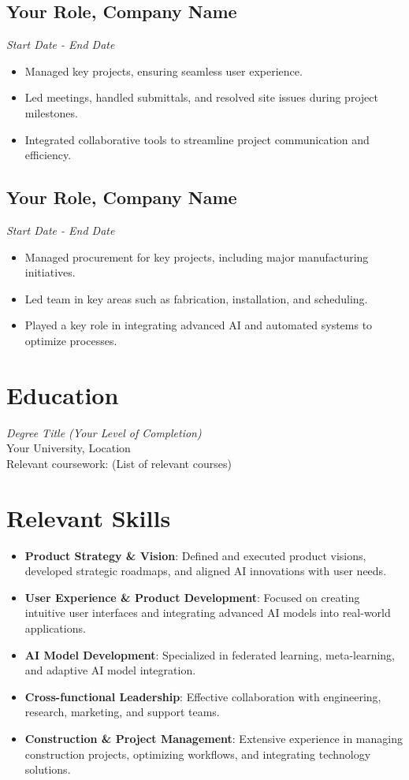 \documentclass[a4paper,10pt]{article}
\newcommand{\daterange}[1]{\textit{\textcolor{mybronze}{#1}}}
\newcommand{\skill}[1]{\textbf{\textcolor{mysecondary}{#1}}}
\begin{document}
\subsection*{Your Role, Company Name}
\daterange{Start Date - End Date}
\begin{itemize}
    \item Managed key projects, ensuring seamless user experience.
    \item Led meetings, handled submittals, and resolved site issues during project milestones.
    \item Integrated collaborative tools to streamline project communication and efficiency.
\end{itemize}

\subsection*{Your Role, Company Name}
\daterange{Start Date - End Date}
\begin{itemize}
    \item Managed procurement for key projects, including major manufacturing initiatives.
    \item Led team in key areas such as fabrication, installation, and scheduling.
    \item Played a key role in integrating advanced AI and automated systems to optimize processes.
\end{itemize}
\vspace{-0.5em}

\section*{Education}
\textit{\textcolor{mybronze}{Degree Title (Your Level of Completion)}}  \\
\textcolor{mysecondary}{Your University, Location}  \\
Relevant coursework: (List of relevant courses)

\section*{Relevant Skills}
\begin{itemize}
    \item \skill{Product Strategy \& Vision}: Defined and executed product visions, developed strategic roadmaps, and aligned AI innovations with user needs.
    \item \skill{User Experience \& Product Development}: Focused on creating intuitive user interfaces and integrating advanced AI models into real-world applications.
    \item \skill{AI Model Development}: Specialized in federated learning, meta-learning, and adaptive AI model integration.
    \item \skill{Cross-functional Leadership}: Effective collaboration with engineering, research, marketing, and support teams.
    \item \skill{Construction \& Project Management}: Extensive experience in managing construction projects, optimizing workflows, and integrating technology solutions.
\end{itemize}
\end{document}
